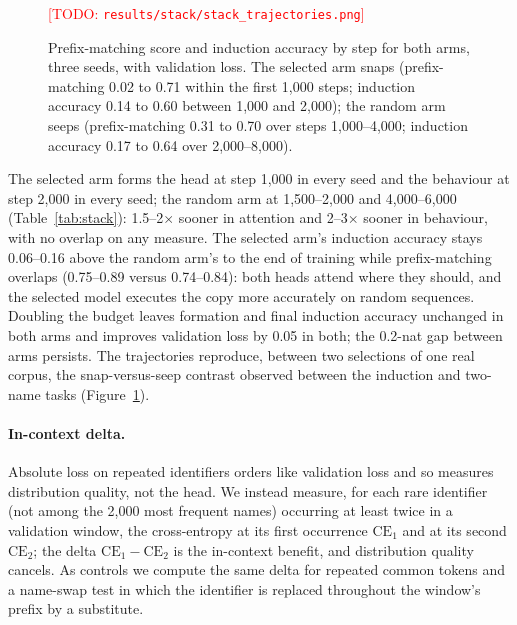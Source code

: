 \documentclass[11pt]{article}
\newcommand{\todo}[1]{\textcolor{red}{[TODO: #1]}}
\begin{document}
\begin{figure}[t]\centering
\todo{\texttt{results/stack/stack\_trajectories.png}}
\caption{Prefix-matching score and induction accuracy by step for both
arms, three seeds, with validation loss. The selected arm snaps
(prefix-matching 0.02 to 0.71 within the first 1,000 steps; induction
accuracy 0.14 to 0.60 between 1,000 and 2,000); the random arm seeps
(prefix-matching 0.31 to 0.70 over steps 1,000--4,000; induction accuracy
0.17 to 0.64 over 2,000--8,000).}
\label{fig:stack}
\end{figure}

The selected arm forms the head at step 1,000 in every seed and the
behaviour at step 2,000 in every seed; the random arm at 1,500--2,000 and
4,000--6,000 (Table~\ref{tab:stack}): 1.5--2$\times$ sooner in attention and
2--3$\times$ sooner in behaviour, with no overlap on any measure. The
selected arm's induction accuracy stays 0.06--0.16 above the random arm's
to the end of training while prefix-matching overlaps (0.75--0.89 versus
0.74--0.84): both heads attend where they should, and the selected model
executes the copy more accurately on random sequences. Doubling the budget
leaves formation and final induction accuracy unchanged in both arms and
improves validation loss by 0.05 in both; the 0.2-nat gap between arms
persists. The trajectories reproduce, between two selections of one real
corpus, the snap-versus-seep contrast observed between the induction and
two-name tasks (Figure~\ref{fig:stack}).

\paragraph{In-context delta.}
Absolute loss on repeated identifiers orders like validation loss and so
measures distribution quality, not the head. We instead measure, for each
rare identifier (not among the 2,000 most frequent names) occurring at
least twice in a validation window, the cross-entropy at its first
occurrence $\mathrm{CE}_1$ and at its second $\mathrm{CE}_2$; the delta
$\mathrm{CE}_1-\mathrm{CE}_2$ is the in-context benefit, and distribution
quality cancels. As controls we compute the same delta for repeated common
tokens and a name-swap test in which the identifier is replaced throughout
the window's prefix by a substitute.
\end{document}
